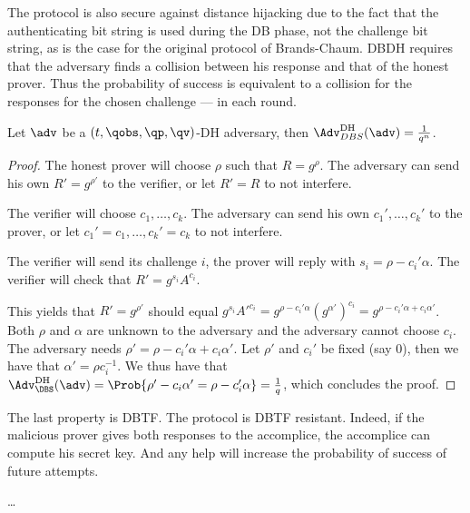 The protocol is also secure against distance hijacking due to the fact that the 
authenticating bit string is used during the \ac{DB} phase, not the challenge 
bit string, as is the case for the original protocol of Brands-Chaum.
\Ac{DBDH} requires that the adversary finds a collision between his response 
and that of the honest prover.
Thus the probability of success is equivalent to a collision for the responses 
for the chosen challenge --- in each round.

\begin{theorem}
  Let \(\adv\) be a \((t, \qobs, \qp, \qv)\)-DH adversary, then 
  \(\Adv_{DBS}^{\text{DH}}(\adv) = \frac{1}{q^n}\).
\end{theorem}

\begin{proof}
  The honest prover will choose \(\rho\) such that \(R = g^\rho\).
  The adversary can send his own \(R' = g^{\rho'}\) to the verifier, or let 
  \(R' = R\) to not interfere.

  The verifier will choose \(c_1, \dotsc, c_k\).
  The adversary can send his own \(c_1', \dotsc, c_k'\) to the prover, or let 
  \(c_1' = c_1, \dotsc, c_k' = c_k\) to not interfere.

  The verifier will send its challenge \(i\), the prover will reply with \(s_i 
    = \rho - c_i' \alpha\).
  The verifier will check that \(R' = g^{s_i} A^{c_i}\).

  This yields that \(R' = g^{\rho'}\) should equal \(g^{s_i} A'^{c_i} = g^{\rho 
      - c_i' \alpha} (g^{\alpha'})^{c_i} = g^{\rho - c_i' \alpha + c_i 
      \alpha'}\).
  Both \(\rho\) and \(\alpha\) are unknown to the adversary and the adversary 
  cannot choose \(c_i\).
  The adversary needs \(\rho' = \rho - c_i' \alpha + c_i \alpha'\).
  Let \(\rho'\) and \(c_i'\) be fixed (say 0), then we have that \(\alpha' = 
    \rho c_i^{-1}\).
  We thus have that
  \(\Adv_{\DBS}^{\text{DH}}(\adv) = \Prob{\rho' - c_i \alpha' = \rho - c_i' 
      \alpha} = \frac{1}{q}\),
  which concludes the proof.
\end{proof}

The last property is \ac{DBTF}.
The protocol is \ac{DBTF} resistant.
Indeed, if the malicious prover gives both responses to the accomplice, the 
accomplice can compute his secret key.
And any help will increase the probability of success of future attempts.

\begin{theorem}
  \dots
\end{theorem}


